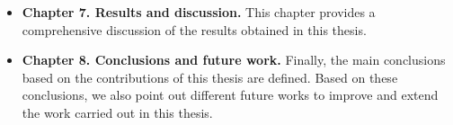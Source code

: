 \begin{itemize}
\item \textbf{Chapter 7. Results and discussion.} This chapter provides a comprehensive discussion of the results obtained in this thesis.
\item \textbf{Chapter 8. Conclusions and future work.} Finally, the main conclusions based on the contributions of this thesis are defined. Based on these conclusions, we  also point out different future works to improve and extend the work carried out in this thesis.   
\end{itemize}

